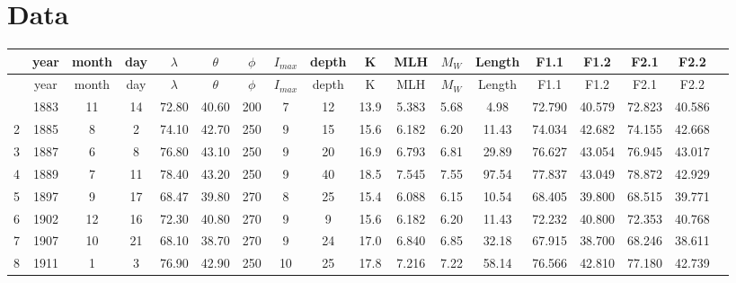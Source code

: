 
\chapter{Data} %

\label{AppendixA} %



  
\setlength\tabcolsep{2pt}\small        
\begin{longtable}{cccccccccccccccccc}
\centering
 & year & month & day & $\lambda$ & $\theta$ & $\phi$ & $I_{max}$ & depth & K & MLH & $M_W$ & Length & F1.1 & F1.2 & F2.1 & F2.2 \\ 
  \hline
\hline
\endfirsthead
\hline
 & year & month & day & $\lambda$ & $\theta$& $\phi$ & $I_{max}$ & depth  & K & MLH & $M_W$ & Length & F1.1 & F1.2 & F2.1 & F2.2 \\ 
  \hline 
\hline
\endhead
\hline %
\endfoot
\endlastfoot
1 & 1883 & 11 & 14 & 72.80 & 40.60 & 200 & 7 & 12 & 13.9 & 5.383 & 5.68 & 4.98 & 72.790 & 40.579 & 72.823 & 40.586 \\ 
  2 & 1885 & 8 & 2 & 74.10 & 42.70 & 250 & 9 & 15 & 15.6 & 6.182 & 6.20 & 11.43 & 74.034 & 42.682 & 74.155 & 42.668 \\ 
  3 & 1887 & 6 & 8 & 76.80 & 43.10 & 250 & 9 & 20 & 16.9 & 6.793 & 6.81 & 29.89 & 76.627 & 43.054 & 76.945 & 43.017 \\ 
  4 & 1889 & 7 & 11 & 78.40 & 43.20 & 250 & 9 & 40 & 18.5 & 7.545 & 7.55 & 97.54 & 77.837 & 43.049 & 78.872 & 42.929 \\ 
  5 & 1897 & 9 & 17 & 68.47 & 39.80 & 270 & 8 & 25 & 15.4 & 6.088 & 6.15 & 10.54 & 68.405 & 39.800 & 68.515 & 39.771 \\ 
  6 & 1902 & 12 & 16 & 72.30 & 40.80 & 270 & 9 & 9 & 15.6 & 6.182 & 6.20 & 11.43 & 72.232 & 40.800 & 72.353 & 40.768 \\ 
  7 & 1907 & 10 & 21 & 68.10 & 38.70 & 270 & 9 & 24 & 17.0 & 6.840 & 6.85 & 32.18 & 67.915 & 38.700 & 68.246 & 38.611 \\ 
  8 & 1911 & 1 & 3 & 76.90 & 42.90 & 250 & 10 & 25 & 17.8 & 7.216 & 7.22 & 58.14 & 76.566 & 42.810 & 77.180 & 42.739 \\ 

\end{longtable}
